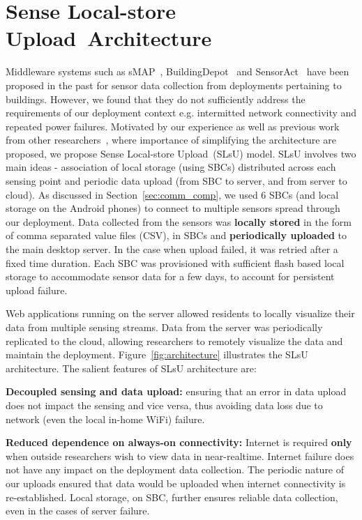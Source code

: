 \documentclass[10pt]{sensys-proc}
\newcommand{\figref}[1]{Figure~\ref{#1}}
\newcommand{\secref}[1]{Section~\ref{#1}}
\newcommand{\selstup}{SLsU}
\newcommand{\paradigms}{Sense Local-store Upload~}
\newcommand{\selstups}{SLsU }
\begin{document}
\section{\paradigms Architecture}	
\label{sec:architecture}
Middleware systems such as sMAP~\cite{smap}, BuildingDepot~\cite{buildingdepot} and SensorAct~\cite{Arjunan12} have been proposed in the past for sensor data collection from deployments pertaining to buildings. However, we found that they do not sufficiently address the requirements of our deployment context e.g. intermitted network connectivity and repeated power failures. Motivated by our experience as well as previous work from other researchers~\cite{hitchhiker_residential}, where importance of simplifying the architecture are proposed, we propose \paradigms (\selstup) model. \selstups involves two main ideas - association of local storage (using SBCs) distributed across each sensing point and periodic data upload (from SBC to server, and from server to cloud). As discussed in \secref{sec:comm_comp}, we used 6 SBCs (and local storage on the Android phones) to connect to multiple sensors spread through our deployment. Data collected from the sensors was \textbf{locally stored} in the form of comma separated value files (CSV), in SBCs and \textbf{periodically uploaded} to the main desktop server. In the case when upload failed, it was retried after a fixed time duration. Each SBC was provisioned with sufficient flash based local storage to accommodate sensor data for a few days, to account for persistent upload failure.

Web applications running on the server allowed residents to locally visualize their data from multiple sensing streams. Data from the server was periodically replicated to the cloud, allowing researchers to remotely visualize the data and maintain the deployment. \figref{fig:architecture} illustrates the \selstups architecture. The salient features of \selstups architecture are:


\noindent \textbf{Decoupled sensing and data upload:} ensuring that an error in data upload does not impact the sensing and vice versa, thus avoiding data loss due to network (even the local in-home WiFi) failure. %

\noindent \textbf{Reduced dependence on always-on connectivity:} Internet is required \textbf{only} when outside researchers wish to view data in near-realtime. Internet failure does not have any impact on the deployment data collection. The periodic nature of our uploads ensured that data would be uploaded when internet connectivity is re-established. Local storage, on SBC, further ensures reliable data collection, even in the cases of server failure. %
\end{document}
